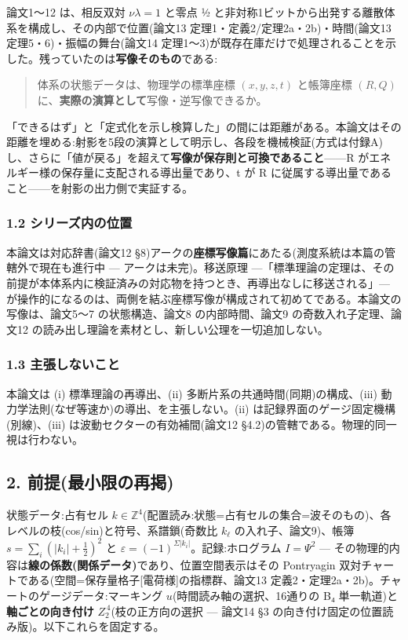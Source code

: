 \documentclass[
]{ltjsarticle}
\begin{document}
論文1〜12 は、相反双対 \(\nu\lambda=1\) と零点 ½
と非対称1ビットから出発する離散体系を構成し、その内部で位置(論文13
定理1・定義2/定理2a・2b)・時間(論文13 定理5・6)・振幅の舞台(論文14
定理1〜3)が既存在庫だけで処理されることを示した。残っていたのは\textbf{写像そのもの}である:

\begin{quote}
体系の状態データは、物理学の標準座標 \((x,y,z,t)\) と帳簿座標 \((R,Q)\)
に、\textbf{実際の演算として}写像・逆写像できるか。
\end{quote}

「できるはず」と「定式化を示し検算した」の間には距離がある。本論文はその距離を埋める:射影を5段の演算として明示し、各段を機械検証(方式は付録A)し、さらに「値が戻る」を超えて\textbf{写像が保存則と可換であること}------R
がエネルギー様の保存量に支配される導出量であり、t が R
に従属する導出量であること------を射影の出力側で実証する。

\subsubsection{1.2
シリーズ内の位置}\label{ux30b7ux30eaux30fcux30baux5185ux306eux4f4dux7f6e}

本論文は対応辞書(論文12
§8)アークの\textbf{座標写像篇}にあたる(測度系統は本篇の管轄外で現在も進行中
--- アークは未完)。移送原理
---「標準理論の定理は、その前提が本体系内に検証済みの対応物を持つとき、再導出なしに移送される」---
が操作的になるのは、両側を結ぶ座標写像が構成されて初めてである。本論文の写像は、論文5〜7
の状態構造、論文8 の内部時間、論文9 の奇数入れ子定理、論文12
の読み出し理論を素材とし、新しい公理を一切追加しない。

\subsubsection{1.3
主張しないこと}\label{ux4e3bux5f35ux3057ux306aux3044ux3053ux3068}

本論文は (i) 標準理論の再導出、(ii)
多断片系の共通時間(同期)の構成、(iii)
動力学法則(なぜ等速か)の導出、を主張しない。(ii)
は記録界面のゲージ固定機構(別線)、(iii) は波動セクターの有効補間(論文12
§4.2)の管轄である。物理的同一視は行わない。

\subsection{2.
前提(最小限の再掲)}\label{ux524dux63d0ux6700ux5c0fux9650ux306eux518dux63b2}

状態データ:占有セル
\(k\in\mathbb{Z}^4\)(配置読み:状態=占有セルの集合=波そのもの)、各レベルの枝(cos/sin)と符号、系譜鎖(奇数比
\(k_\ell\) の入れ子、論文9)、帳簿 \(s=\sum_i(|k_i|+\tfrac12)^2\) と
\(\varepsilon=(-1)^{\Sigma|k_i|}\)。記録:ホログラム \(I=\Psi^2\) ---
その物理的内容は\textbf{線の係数(関係データ)}であり、位置空間表示はその
Pontryagin
双対チャートである(空間=保存量格子{[}電荷様{]}の指標群、論文13
定義2・定理2a・2b)。チャートのゲージデータ:マーキング
\(u\)(時間読み軸の選択、16通りの B₄ 単一軌道)と\textbf{軸ごとの向き付け}
\(Z_2^{\,4}\)(枝の正方向の選択 --- 論文14 §3
の向き付け固定の位置読み版)。以下これらを固定する。
\end{document}
